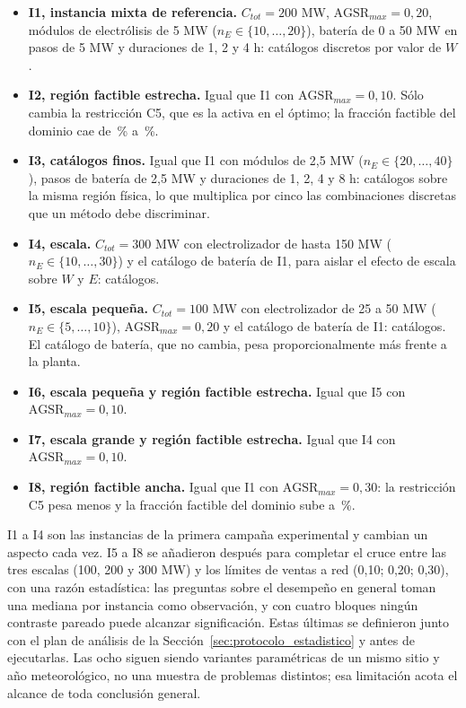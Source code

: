 \begin{itemize}
    \item \textbf{I1, instancia mixta de referencia.} $C_{tot}=200$ MW, $\mathrm{AGSR}_{max}=0{,}20$, módulos de electrólisis de 5 MW ($n_E\in\{10,\ldots,20\}$), batería de 0 a 50 MW en pasos de 5 MW y duraciones de 1, 2 y 4 h: \InstCatalogsA{} catálogos discretos por valor de $W$.
    \item \textbf{I2, región factible estrecha.} Igual que I1 con $\mathrm{AGSR}_{max}=0{,}10$. Sólo cambia la restricción C5, que es la activa en el óptimo; la fracción factible del dominio cae de \BFAFeasiblePct\,\% a \BFBFeasiblePct\,\%.
    \item \textbf{I3, catálogos finos.} Igual que I1 con módulos de 2,5 MW ($n_E\in\{20,\ldots,40\}$), pasos de batería de 2,5 MW y duraciones de 1, 2, 4 y 8 h: \InstCatalogsC{} catálogos sobre la misma región física, lo que multiplica por cinco las combinaciones discretas que un método debe discriminar.
    \item \textbf{I4, escala.} $C_{tot}=300$ MW con electrolizador de hasta 150 MW ($n_E\in\{10,\ldots,30\}$) y el catálogo de batería de I1, para aislar el efecto de escala sobre $W$ y $E$: \InstCatalogsD{} catálogos.
    \item \textbf{I5, escala pequeña.} $C_{tot}=100$ MW con electrolizador de 25 a 50 MW ($n_E\in\{5,\ldots,10\}$), $\mathrm{AGSR}_{max}=0{,}20$ y el catálogo de batería de I1: \InstCatalogsE{} catálogos. El catálogo de batería, que no cambia, pesa proporcionalmente más frente a la planta.
    \item \textbf{I6, escala pequeña y región factible estrecha.} Igual que I5 con $\mathrm{AGSR}_{max}=0{,}10$.
    \item \textbf{I7, escala grande y región factible estrecha.} Igual que I4 con $\mathrm{AGSR}_{max}=0{,}10$.
    \item \textbf{I8, región factible ancha.} Igual que I1 con $\mathrm{AGSR}_{max}=0{,}30$: la restricción C5 pesa menos y la fracción factible del dominio sube a \BFHFeasiblePct\,\%.
\end{itemize}

I1 a I4 son las instancias de la primera campaña experimental y cambian un aspecto cada vez. I5 a I8 se añadieron después para completar el cruce entre las tres escalas (100, 200 y 300 MW) y los límites de ventas a red (0,10; 0,20; 0,30), con una razón estadística: las preguntas sobre el desempeño en general toman una mediana por instancia como observación, y con cuatro bloques ningún contraste pareado puede alcanzar significación. Estas últimas se definieron junto con el plan de análisis de la Sección~\ref{sec:protocolo_estadistico} y antes de ejecutarlas. Las ocho siguen siendo variantes paramétricas de un mismo sitio y año meteorológico, no una muestra de problemas distintos; esa limitación acota el alcance de toda conclusión general.

